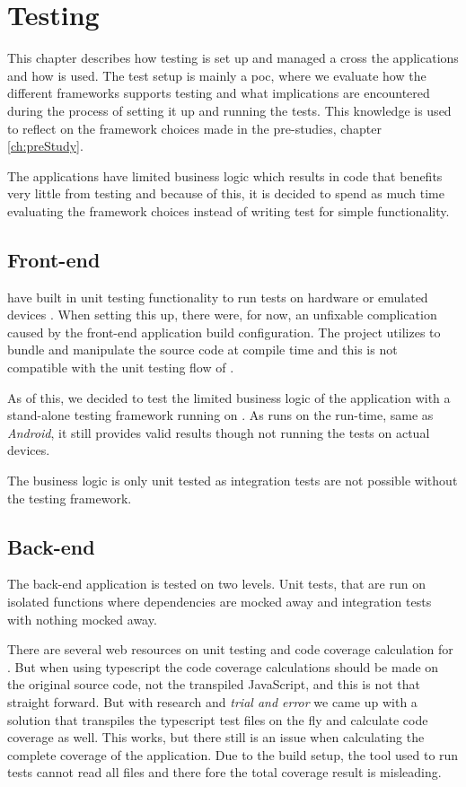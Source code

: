\chapter{Testing}
This chapter describes how testing is set up and managed a cross the applications and how  is used.
The test setup is mainly a \gls{poc}, where we evaluate how the different frameworks supports testing and what implications are encountered during the process of setting it up and running the tests.
This knowledge is used to reflect on the framework choices made in the pre-studies, chapter \ref{ch:preStudy}.

The applications have limited business logic which results in code that benefits very little from testing and because of this, it is decided to spend as much time evaluating the framework choices instead of writing test for simple functionality.

\section{Front-end}
 have built in unit testing functionality to run tests on hardware or emulated devices \citep{testing:nativescript}.
When setting this up, there were, for now, an unfixable complication caused by the front-end application build configuration.
The project utilizes  to bundle and manipulate the source code at compile time and this is not compatible with the unit testing flow of .

As of this, we decided to test the limited business logic of the application with a stand-alone testing framework running on .
As  runs on the  run-time, same as \textit{Android}, it still provides valid results though not running the tests on actual devices.

The business logic is only unit tested as integration tests are not possible without the  testing framework.

\section{Back-end}
The back-end application is tested on two levels.
Unit tests, that are run on isolated functions where dependencies are mocked away and integration tests with nothing mocked away.

There are several web resources on unit testing and code coverage calculation for .
But when using \gls{typescript} the code coverage calculations should be made on the original source code, not the transpiled JavaScript, and this is not that straight forward.
But with research and \textit{trial and error} we came up with a solution that transpiles the \gls{typescript} test files on the fly and calculate code coverage as well.
This works, but there still is an issue when calculating the complete coverage of the application.
Due to the build setup, the tool used to run tests cannot read all files and there fore the total coverage result is misleading.

